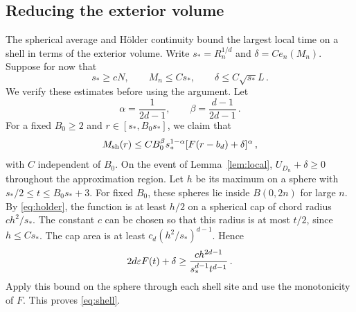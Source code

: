 \subsection{Reducing the exterior volume}
The spherical average and H\"older continuity bound the largest local
time on a shell in terms of the exterior volume.
Write $s_*=R_n^{1/d}$ and $\delta=Ce_n(M_n)$.
Suppose for now that
\begin{equation}\label{eq:preconditions}
s_*\geq cN ,\qquad M_n\leq Cs_* ,\qquad
\delta\leq C\sqrt{s_*}L\, .
\end{equation}
We verify these estimates before using the argument.
Let
\begin{equation}\label{eq:alpha-beta}
\alpha=\frac1{2d-1} ,\qquad \beta=\frac{d-1}{2d-1}\, .
\end{equation}
For a fixed $B_0\geq2$ and $r\in[s_*,B_0s_*]$, we claim that
\begin{equation}\label{eq:shell}
M_{\rm sh}(r)\leq CB_0^\beta s_*^{1-\alpha}
 [F(r-b_d)+\delta]^\alpha\, ,
\end{equation}
with $C$ independent of $B_0$.
On the event of Lemma~\ref{lem:local}, $U_{D_n}+\delta\geq0$
throughout the approximation region.
Let $h$ be its maximum on a sphere with
$s_*/2\leq t\leq B_0s_*+3$. For fixed $B_0$, these spheres lie
inside $B(0,2n)$ for large $n$.
By \eqref{eq:holder}, the function is at least $h/2$ on a spherical
cap of chord radius $ch^2/s_*$. The constant $c$ can be chosen so
that this radius is at most $t/2$, since $h\leq Cs_*$.
The cap area is at least $c_d(h^2/s_*)^{d-1}$. Hence
\begin{equation}\label{eq:cap-average}
2d\varepsilon F(t)+\delta\geq
\frac{ch^{2d-1}}{s_*^{d-1}t^{d-1}}\, .
\end{equation}
Apply this bound on the sphere through each shell site and use the
monotonicity of $F$. This proves \eqref{eq:shell}.

